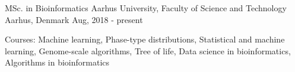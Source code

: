 

\begin{cventries}

  \cventry
    {MSc. in Bioinformatics} %
    {Aarhus University, Faculty of Science and Technology} %
    {Aarhus, Denmark} %
    {Aug, 2018 - present} %
    {
      \begin{cvitems} %
        \item {Courses: 
        Machine learning, 
        Phase-type distributions,
        Statistical and machine learning, 
        Genome-scale algorithms, 
        Tree of life, 
        Data science in bioinformatics, 
        Algorithms in bioinformatics
        }
      \end{cvitems}
    }


\end{cventries}
